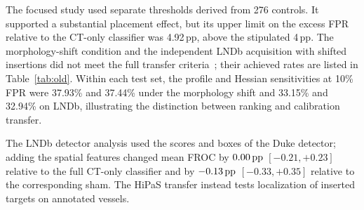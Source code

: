 The focused study used separate thresholds derived from 276 controls. It supported a substantial placement effect, but its upper limit on the excess FPR relative to the CT-only classifier was 4.92\,pp, above the stipulated 4\,pp. The morphology-shift condition and the independent LNDb acquisition with shifted insertions did not meet the full transfer criteria~\cite{pedrosa2021}; their achieved rates are listed in Table~\ref{tab:old}. Within each test set, the profile and Hessian sensitivities at 10\% FPR were 37.93\% and 37.44\% under the morphology shift and 33.15\% and 32.94\% on LNDb, illustrating the distinction between ranking and calibration transfer.

The LNDb detector analysis used the scores and boxes of the Duke detector; adding the spatial features changed mean FROC by $0.00\,\mathrm{pp}$ $[-0.21,+0.23]$ relative to the full CT-only classifier and by $-0.13\,\mathrm{pp}$ $[-0.33,+0.35]$ relative to the corresponding sham. The HiPaS transfer instead tests localization of inserted targets on annotated vessels.
